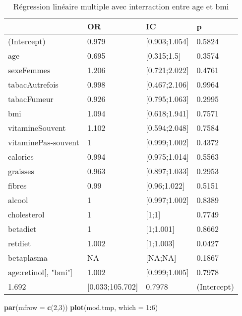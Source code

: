 \documentclass[]{article}
\newenvironment{Shaded}{\begin{snugshade}}{\end{snugshade}}
\newcommand{\KeywordTok}[1]{\textcolor[rgb]{0.13,0.29,0.53}{\textbf{#1}}}
\newcommand{\DataTypeTok}[1]{\textcolor[rgb]{0.13,0.29,0.53}{#1}}
\newcommand{\DecValTok}[1]{\textcolor[rgb]{0.00,0.00,0.81}{#1}}
\newcommand{\OperatorTok}[1]{\textcolor[rgb]{0.81,0.36,0.00}{\textbf{#1}}}
\newcommand{\NormalTok}[1]{#1}
\begin{document}
\begin{table}

\caption{\label{tab:unnamed-chunk-83}Régression linéaire multiple avec interraction entre age et bmi}
\centering
\begin{tabular}[t]{l|l|l|l}
\hline
  & OR & IC & p\\
\hline
\rowcolor[HTML]{BBD2E1}  (Intercept) & 0.979 & [0.903;1.054] & 0.5824\\
\hline
age & 0.695 & [0.315;1.5] & 0.3574\\
\hline
\rowcolor[HTML]{BBD2E1}  sexeFemmes & 1.206 & [0.721;2.022] & 0.4761\\
\hline
tabacAutrefois & 0.998 & [0.467;2.106] & 0.9964\\
\hline
\rowcolor[HTML]{BBD2E1}  tabacFumeur & 0.926 & [0.795;1.063] & 0.2995\\
\hline
bmi & 1.094 & [0.618;1.941] & 0.7571\\
\hline
\rowcolor[HTML]{BBD2E1}  vitamineSouvent & 1.102 & [0.594;2.048] & 0.7584\\
\hline
vitaminePas-souvent & 1 & [0.999;1.002] & 0.4372\\
\hline
\rowcolor[HTML]{BBD2E1}  calories & 0.994 & [0.975;1.014] & 0.5563\\
\hline
graisses & 0.963 & [0.897;1.033] & 0.2953\\
\hline
\rowcolor[HTML]{BBD2E1}  fibres & 0.99 & [0.96;1.022] & 0.5151\\
\hline
alcool & 1 & [0.997;1.002] & 0.8389\\
\hline
\rowcolor[HTML]{BBD2E1}  cholesterol & 1 & [1;1] & 0.7749\\
\hline
betadiet & 1 & [1;1.001] & 0.8662\\
\hline
\rowcolor[HTML]{BBD2E1}  retdiet & 1.002 & [1;1.003] & 0.0427\\
\hline
betaplasma & NA & [NA;NA] & 0.1867\\
\hline
\rowcolor[HTML]{BBD2E1}  age:retinol[, "bmi"] & 1.002 & [0.999;1.005] & 0.7978\\
\hline
1.692 & [0.033;105.702] & 0.7978 & (Intercept)\\
\hline
\end{tabular}
\end{table}

\begin{Shaded}
\begin{Highlighting}[]
\KeywordTok{par}\NormalTok{(}\DataTypeTok{mfrow =} \KeywordTok{c}\NormalTok{(}\DecValTok{2}\NormalTok{,}\DecValTok{3}\NormalTok{))}
\KeywordTok{plot}\NormalTok{(mod.tmp, }\DataTypeTok{which =} \DecValTok{1}\OperatorTok{:}\DecValTok{6}\NormalTok{)}
\end{Highlighting}
\end{Shaded}
\end{document}
